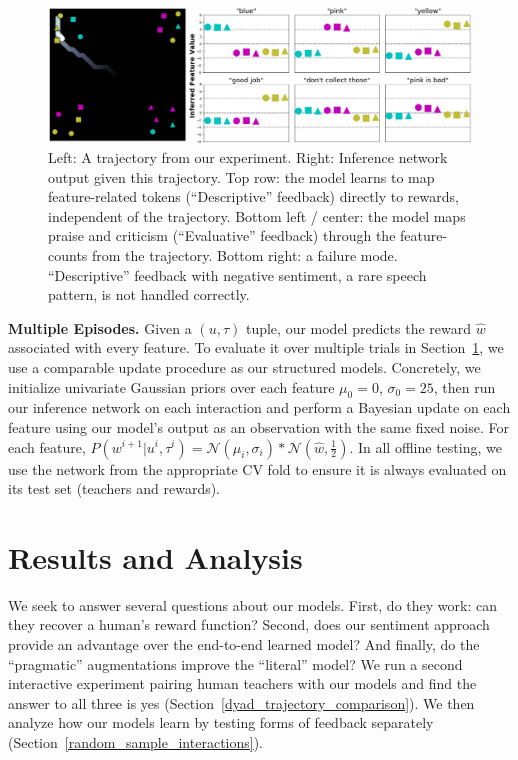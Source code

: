 \documentclass[letterpaper]{article} %
\begin{document}
\begin{figure}[h]
\begin{center}
\includegraphics[width=14cm]{images/neural_net_learning_final.png}
\end{center}
\caption{Left: A trajectory from our experiment. Right: Inference network output given this trajectory. Top row: the model learns to map feature-related tokens (``Descriptive'' feedback) directly to rewards, independent of the trajectory. Bottom left / center: the model maps praise and criticism (``Evaluative'' feedback) through the feature-counts from the trajectory. Bottom right: a failure mode. ``Descriptive'' feedback with negative sentiment, a rare speech pattern, is not handled correctly.} 
\label{learned_utterance_targets}
\end{figure}

\textbf{Multiple Episodes.} Given a $(u, \tau)$ tuple, our model predicts the reward $\hat{w}$ associated with every feature. To evaluate it over multiple trials in Section~\ref{results_and_analysis_section}, we use a comparable update procedure as our structured models. Concretely, we initialize univariate Gaussian priors over each feature $\mu_0 = 0$, $\sigma_0 = 25$, then run our inference network on each interaction and perform a Bayesian update on each feature using our model's output as an observation with the same fixed noise. For each feature, $P(w^{i+1} | u^i, \tau^i) = \mathcal{N}(\mu_{i},\sigma_{i}) * \mathcal{N}(\hat{w}, \frac{1}{2})$. In all offline testing, we use the network from the appropriate CV fold to ensure it is always evaluated on its test set (teachers and rewards).

\section{Results and Analysis}
\label{results_and_analysis_section}
We seek to answer several questions about our models. First, do they work: can they recover a human's reward function? Second, does our sentiment approach provide an advantage over the end-to-end learned model? And finally, do the ``pragmatic'' augmentations improve the ``literal'' model? We run a second interactive experiment pairing human teachers with our models and find the answer to all three is yes (Section~\ref{dyad_trajectory_comparison}). We then analyze how our models learn by testing forms of feedback separately (Section~\ref{random_sample_interactions}).
\end{document}
